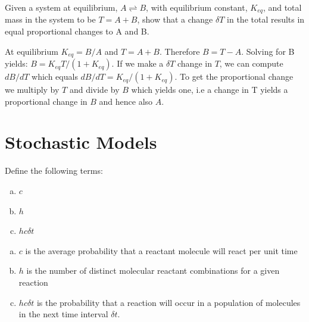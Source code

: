 \documentclass[12pt]{article}
\begin{document}
\begin{question}
Given a system at equilibrium, $A \rightleftharpoons B$, with equilibrium constant, $K_{eq}$, and total mass in the system to be $T = A + B$, show that a change $\delta T$  in the total results in equal proportional changes to A and B.
\end{question}
\begin{solution}
At equilibrium $K_{eq} = B/A$ and $T = A + B$. Therefore $B = T - A$. Solving for B yields: $B = K_{eq} T/(1 + K_{eq})$. If we make a $\delta T$ change in $T$, we can compute $dB/dT$ which equals $dB/dT = K_{eq}/(1 + K_{eq})$. To get the proportional change we multiply by $T$ and divide by $B$ which yields one, i.e a change in T yields a proportional change in $B$ and hence also $A$.
\end{solution}



\section{Stochastic Models}


\begin{question}
Define the following terms:

\begin{enumerate}[a)]
  \item $c$
  \item $h$
  \item $h c \delta t$
\end{enumerate}

\end{question}
\begin{solution}
\begin{enumerate}[a)]
 \item $c$ is the average probability that a reactant molecule will react per unit time
 \item $h$ is the number of distinct molecular reactant combinations for a given reaction
 \item $h c \delta t$ is the probability that a reaction will occur in a population of molecules in the next time interval $\delta t$.
\end{enumerate}
\end{solution}
\end{document}
